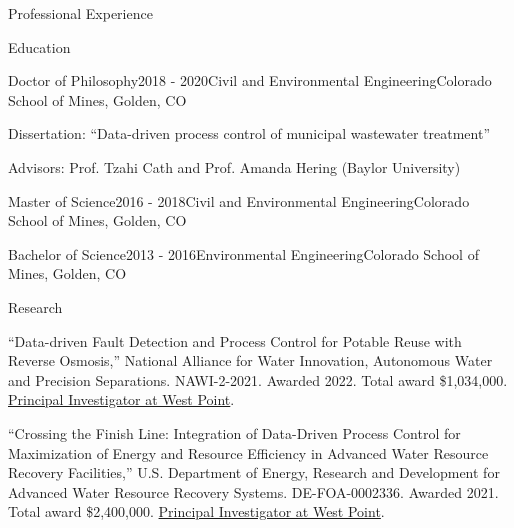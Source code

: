 \documentclass{resume} %
\begin{document}
\begin{rSection}{Professional Experience}
\begin{rSection}{Education}

\begin{rSubsection}{Doctor of Philosophy}{2018 - 2020}{Civil and Environmental Engineering}{Colorado School of Mines, Golden, CO}
\item Dissertation: “Data-driven process control of municipal wastewater treatment”
\item Advisors: Prof. Tzahi Cath and Prof. Amanda Hering (Baylor University)
\end{rSubsection}

\begin{rSubsection}{Master of Science}{2016 - 2018}{Civil and Environmental Engineering}{Colorado School of Mines, Golden, CO}
\end{rSubsection}

\begin{rSubsection}{Bachelor of Science}{2013 - 2016}{Environmental Engineering}{Colorado School of Mines, Golden, CO}
\end{rSubsection}

\end{rSection}



\begin{rSection}{Research}


``Data-driven Fault Detection and Process Control for Potable Reuse with Reverse Osmosis,'' National Alliance for Water Innovation, Autonomous Water and Precision Separations. NAWI-2-2021. Awarded 2022. Total award \$1,034,000. \ul{Principal Investigator at West Point}.

``Crossing the Finish Line: Integration of Data-Driven Process Control for Maximization of Energy and Resource Efficiency in Advanced Water Resource Recovery Facilities,'' U.S. Department of Energy, Research and Development for Advanced Water Resource Recovery Systems. DE-FOA-0002336. Awarded 2021. Total award \$2,400,000. \ul{Principal Investigator at West Point}.


\end{rSection}
\end{rSection}
\end{document}
